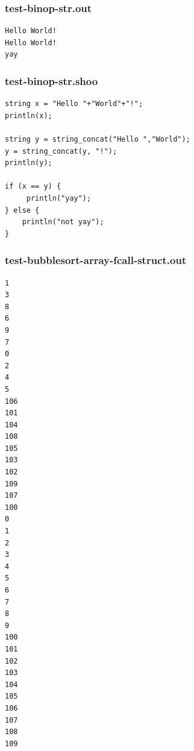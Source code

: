\documentclass[12pt]{article}
\begin{document}
\subsubsection{test-binop-str.out}
\begin{mdframed}[hidealllines=true,backgroundcolor=green!10]
\begin{lstlisting}
Hello World!
Hello World!
yay
\end{lstlisting}
\end{mdframed}
\subsubsection{test-binop-str.shoo}
\begin{mdframed}[hidealllines=true,backgroundcolor=blue!10]
\begin{lstlisting}
string x = "Hello "+"World"+"!";
println(x);

string y = string_concat("Hello ","World");
y = string_concat(y, "!");
println(y);

if (x == y) {
     println("yay");
} else {
    println("not yay");
}
\end{lstlisting}
\end{mdframed}
\subsubsection{test-bubblesort-array-fcall-struct.out}
\begin{mdframed}[hidealllines=true,backgroundcolor=green!10]
\begin{lstlisting}
1
3
8
6
9
7
0
2
4
5
106
101
104
108
105
103
102
109
107
100
0
1
2
3
4
5
6
7
8
9
100
101
102
103
104
105
106
107
108
109
\end{lstlisting}
\end{mdframed}
\end{document}
